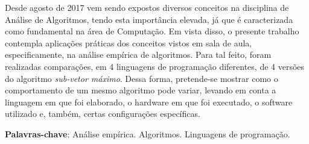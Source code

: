 \documentclass[
	12pt,				%
	oneside,   	        %
	a4paper,			%
	english,			%
	french,				%
	spanish,			%
	brazil,				%
	]{pacotes/abntex2}
\begin{document}
\frenchspacing 



\imprimirfolhaderosto



\begin{resumo}
 Desde agosto de 2017 vem sendo expostos diversos conceitos na disciplina de Análise de Algoritmos, tendo esta importância elevada, já que é caracterizada como fundamental na área de Computação. Em vista disso, o presente trabalho contempla aplicações práticas dos conceitos vistos em sala de aula, especificamente, na análise empírica de algoritmos. Para tal feito, foram realizadas comparações, em 4 linguagens de programação diferentes, de 4 versões do algoritmo \textit{sub-vetor máximo}. Dessa forma, pretende-se mostrar como o comportamento de um mesmo algoritmo pode variar, levando em conta a linguagem em que foi elaborado, o hardware em que foi executado, o software utilizado e, também, certas configurações específicas. 

 \vspace{\onelineskip}
    
 \noindent
 \textbf{Palavras-chave}: Análise empírica. Algoritmos. Linguagens de programação.
\end{resumo}




\tableofcontents*
\cleardoublepage
\end{document}
